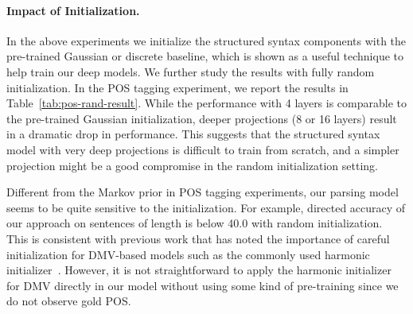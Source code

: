 \documentclass[11pt,a4paper]{article}
\begin{document}
\paragraph{Impact of Initialization. }
\begin{table}[!t]
    \centering
    \caption{Unsupervised POS tagging results of our approach on WSJ, with random initialization of syntax model.}
    \label{tab:pos-rand-result}
    \vspace{-5mm}
\end{table}
In the above experiments we initialize the structured syntax components with the pre-trained Gaussian or discrete baseline, which is shown as a useful technique to help train our deep models. We further study the results with fully random initialization. In the POS tagging experiment, we report the results in Table~\ref{tab:pos-rand-result}. While the performance with 4 layers is comparable to the pre-trained Gaussian initialization, deeper projections (8 or 16 layers) result in a dramatic drop in performance. This suggests that the structured syntax model with very deep projections is difficult to train from scratch, and a simpler projection might be a good compromise in the random initialization setting.   

Different from the Markov prior in POS tagging experiments, our parsing model seems to be quite sensitive to the initialization. For example, directed accuracy of our approach on sentences of length  is below 40.0 with random initialization. This is consistent with previous work that has noted the importance of careful initialization for DMV-based models such as the commonly used harmonic initializer~\citep{klein2004corpus}. However, it is not straightforward to apply the harmonic initializer for DMV directly in our model without using some kind of pre-training since we do not observe gold POS.
\end{document}

